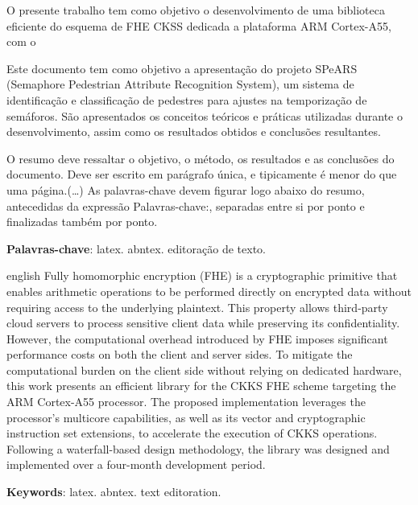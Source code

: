 \documentclass[
	12pt,				%
	openright,			%
	twoside,			%
	a4paper,			%
	english,			%
	french,				%
	spanish,			%
	brazil				%
	]{abntex2}
\begin{document}


\setlength{\absparsep}{18pt} %
\begin{resumo}
O presente trabalho tem como objetivo o desenvolvimento de uma biblioteca eficiente do esquema de FHE CKSS dedicada a plataforma ARM Cortex-A55, com o 

Este documento tem como objetivo a apresentação do projeto SPeARS (Semaphore
Pedestrian Attribute Recognition System), um sistema de identificação e classificação
de pedestres para ajustes na temporização de semáforos. São apresentados os conceitos
teóricos e práticas utilizadas durante o desenvolvimento, assim como os resultados obtidos
e conclusões resultantes.

 O resumo deve ressaltar o  objetivo, o método, os resultados e as conclusões do documento. 
 Deve ser escrito em parágrafo única, e tipicamente é menor do que uma página.(\ldots) 
 As palavras-chave devem figurar logo abaixo do resumo, antecedidas da expressão Palavras-chave:, separadas entre si por ponto e finalizadas também por ponto.

 \textbf{Palavras-chave}: latex. abntex. editoração de texto.
\end{resumo}

\begin{resumo}[Abstract]
 \begin{otherlanguage*}{english}
Fully homomorphic encryption (FHE) is a cryptographic primitive that enables arithmetic operations to be performed directly on encrypted data without requiring access to the underlying plaintext. This property allows third-party cloud servers to process sensitive client data while preserving its confidentiality. However, the computational overhead introduced by FHE imposes significant performance costs on both the client and server sides. To mitigate the computational burden on the client side without relying on dedicated hardware, this work presents an efficient library for the CKKS FHE scheme targeting the ARM Cortex-A55 processor. The proposed implementation leverages the processor's multicore capabilities, as well as its vector and cryptographic instruction set extensions, to accelerate the execution of CKKS operations. Following a waterfall-based design methodology, the library was designed and implemented over a four-month development period.
   \vspace{\onelineskip}
 
   \noindent 
   \textbf{Keywords}: latex. abntex. text editoration.
 \end{otherlanguage*}
\end{resumo}
\end{document}
